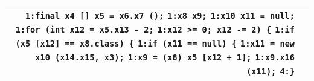 \documentclass[]{article}
\begin{document}
\begin{minipage}{\textwidth}
\begin{tabular}{rp{12.5cm}}
		\verb|1:final x4 [] x5 = x6.x7 ();|\newline
		\verb|1:x8 x9;|\newline
		\verb|1:x10 x11 = null;|\newline
		\verb|1:for (int x12 = x5.x13 - 2;|\newline
		\verb|1:x12 >= 0; x12 -= 2) {|\newline
		\verb|1:if (x5 [x12] == x8.class) {|\newline
		\verb|1:if (x11 == null) {|\newline
		\verb|1:x11 = new x10 (x14.x15, x3);|\newline
		\verb|1:x9 = (x8) x5 [x12 + 1];|\newline
		\verb|1:x9.x16 (x11);|\newline
		\verb|4:}| \\
		\bottomrule[2pt]
	\end{tabular}
	\end{minipage}\\\\
\end{document}

